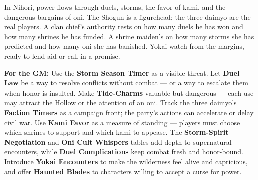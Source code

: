 \begin{tcolorbox}[colback=black!3,colframe=black!40!white,title={Patronage \& Power},breakable]
In Nihori, power flows through duels, storms, the favor of kami, and the dangerous bargains of oni. The Shogun is a figurehead; the three daimyo are the real players. A clan chief's authority rests on how many duels he has won and how many shrines he has funded. A shrine maiden's on how many storms she has predicted and how many oni she has banished. Yokai watch from the margins, ready to lend aid or call in a promise.

\textbf{For the GM:}  
Use the \textbf{Storm Season Timer } as a visible threat. Let \textbf{Duel Law} be a way to resolve conflicts without combat --- or a way to escalate them when honor is insulted. Make \textbf{Tide-Charms} valuable but dangerous --- each use may attract the Hollow or the attention of an oni. Track the three daimyo's \textbf{Faction Timers} as a campaign front; the party's actions can accelerate or delay civil war. Use \textbf{Kami Favor} as a measure of standing --- players must choose which shrines to support and which kami to appease. The \textbf{Storm-Spirit Negotiation} and \textbf{Oni Cult Whispers} tables add depth to supernatural encounters, while \textbf{Duel Complications} keep combat fresh and honor-bound. Introduce \textbf{Yokai Encounters} to make the wilderness feel alive and capricious, and offer \textbf{Haunted Blades} to characters willing to accept a curse for power.
\end{tcolorbox}

